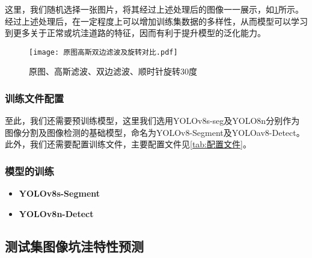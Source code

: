 \documentclass{MathorCupmodeling}
\begin{document}
	这里，我们随机选择一张图片，将其经过上述处理后的图像一一展示，如\textcolor{blue}{\cref{fig:原图高斯双边滤波及旋转对比}}所示。经过上述处理后，在一定程度上可以增加训练集数据的多样性，从而模型可以学习到更多关于正常或坑洼道路的特征，因而有利于提升模型的泛化能力。
	\begin{figure}[H]
		\centering
		\texttt{[image: 原图高斯双边滤波及旋转对比.pdf]}
		\caption{原图、高斯滤波、双边滤波、顺时针旋转30度}
		\label{fig:原图高斯双边滤波及旋转对比}
	\end{figure}

	\subsubsection{训练文件配置}
	至此，我们还需要预训练模型，这里我们选用YOLOv8s-seg及YOLO8n分别作为图像分割及图像检测的基础模型，命名为YOLOv8-Segment及YOLOav8-Detect。此外，我们还需要配置训练文件，主要配置文件见\textcolor{blue}{\cref{tab:配置文件}}。

\begin{table}[htbp]
	\centering
	\caption{模型配置文件}
	\label{tab:配置文件}
  \end{table}
  
	\subsubsection{模型的训练}
	\begin{itemize}
		\item \textbf{YOLOv8s-Segment}
		
		\item \textbf{YOLOv8n-Detect}
	\end{itemize}
	\subsection{测试集图像坑洼特性预测}
\end{document}
